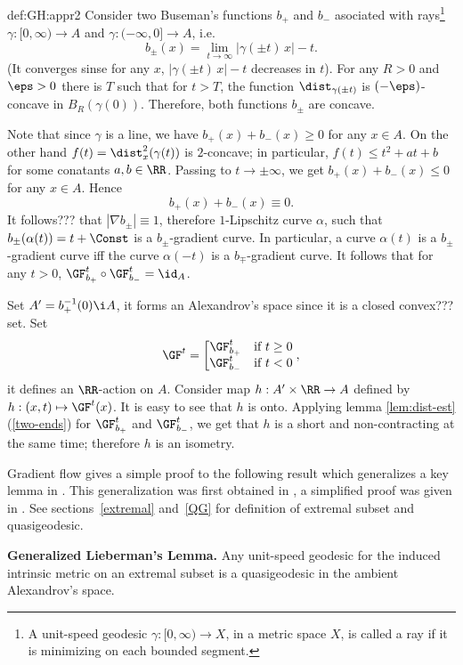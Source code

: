 {\begin{subthm}{def:GH:appr2}
 Consider two Buseman's functions $b_+$ and $b_-$ asociated with rays\footnote{A unit-speed geodesic $\gamma:[0,\infty)\to X$, in a metric space $X$, is called a ray if it is minimizing on each bounded segment.} $\gamma:[0,\infty)\to A$ and $\gamma:(-\infty,0]\to A$, i.e.
$$b_\pm(x)=\lim_{t\to\infty}|\gamma(\pm t)\,x|- t.$$
(It converges sinse for any $x$, $|\gamma(\pm t)\,x|- t$ decreases in $t$).
For any $R>0$ and $\eps>0$ there is $T$ such that for $t>T$, the function $\dist_{\gamma(\pm t)}$ is $(-\eps)$-concave in $B_R(\gamma(0))$.
Therefore, both functions $b_\pm$ are concave.

Note that since $\gamma$ is a line, we have $b_+(x)+b_-(x)\ge0$ for any $x\in A$.
On the other hand $f(t)={\dist^2_x(\gamma(t))}$ is $2$-concave; in particular, $f(t)\le t^2+at+b$ for some conatants $a,b\in\RR$. 
Passing to $t\to\pm\infty$, we get $b_+(x)+b_-(x)\le0$ for any $x\in A$.
Hence 
$$b_+(x)+b_-(x)\equiv 0.$$
It follows??? that $|\nabla b_\pm|\equiv 1$, therefore $1$-Lipschitz curve $\alpha$, such that $b_\pm(\alpha(t))=t+\Const$ is a $b_\pm$-gradient curve. 
In particular, a curve $\alpha(t)$ is a $b_\pm$-gradient curve iff the curve $\alpha(-t)$ is a $b_\mp$-gradient curve.
It follows that for any $t>0$, $\GF_{b_+}^t\circ\GF_{b_-}^t=\id_A$.

Set $A'=b_+^{-1}(0)\i A$, it forms an Alexandrov's space since it is a closed convex??? set.
Set
$$\GF^t=\left[\begin{matrix}
\GF_{b_+}^t&\hbox{if}\ t\ge0\\
\GF_{b_-}^t&\hbox{if}\ t<0
               \end{matrix}\right.,$$
it defines an $\RR$-action on $A$.
Consider map $h:A'\times \RR\to A$ defined by $h:(x,t)\mapsto \GF^t(x)$.
It is easy to see that $h$ is onto.
Applying lemma \ref{lem:dist-est}(\ref{two-ends}) for $\GF_{b_+}^t$ and $\GF_{b_-}^t$, we get that $h$ is a short and non-contracting at the same time; therefore $h$ is an isometry.\qeds



Gradient flow gives a simple proof to the following result which generalizes a key
lemma in \cite{liberman}. 
This generalization was first obtained in
\cite[5.3]{perelman-petrunin:extremal}, a simplified proof was given in
\cite[1.1]{petrunin:extremal}.
See sections~\ref{extremal} and~\ref{QG}  for definition of extremal subset and
quasigeodesic. 

\begin{thm}{\bf Generalized Lieberman's Lemma.}\label{lib-lem} Any unit-speed geodesic for the
induced intrinsic metric on an extremal subset is a quasigeodesic in the ambient
Alexandrov's space.
\end{thm}



\end{subthm}}
